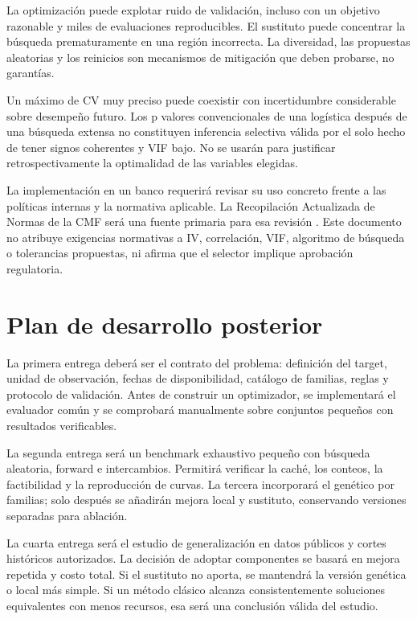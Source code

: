 \documentclass[11pt,letterpaper]{article}
\begin{document}
La optimización puede explotar ruido de validación, incluso con un objetivo razonable y miles de evaluaciones reproducibles. El sustituto puede concentrar la búsqueda prematuramente en una región incorrecta. La diversidad, las propuestas aleatorias y los reinicios son mecanismos de mitigación que deben probarse, no garantías.

Un máximo de CV muy preciso puede coexistir con incertidumbre considerable sobre desempeño futuro. Los p valores convencionales de una logística después de una búsqueda extensa no constituyen inferencia selectiva válida por el solo hecho de tener signos coherentes y VIF bajo. No se usarán para justificar retrospectivamente la optimalidad de las variables elegidas.

La implementación en un banco requerirá revisar su uso concreto frente a las políticas internas y la normativa aplicable. La Recopilación Actualizada de Normas de la CMF será una fuente primaria para esa revisión \cite{ref14}. Este documento no atribuye exigencias normativas a IV, correlación, VIF, algoritmo de búsqueda o tolerancias propuestas, ni afirma que el selector implique aprobación regulatoria.

\section{Plan de desarrollo posterior}\label{sec:14}

La primera entrega deberá ser el contrato del problema: definición del target, unidad de observación, fechas de disponibilidad, catálogo de familias, reglas y protocolo de validación. Antes de construir un optimizador, se implementará el evaluador común y se comprobará manualmente sobre conjuntos pequeños con resultados verificables.

La segunda entrega será un benchmark exhaustivo pequeño con búsqueda aleatoria, forward e intercambios. Permitirá verificar la caché, los conteos, la factibilidad y la reproducción de curvas. La tercera incorporará el genético por familias; solo después se añadirán mejora local y sustituto, conservando versiones separadas para ablación.

La cuarta entrega será el estudio de generalización en datos públicos y cortes históricos autorizados. La decisión de adoptar componentes se basará en mejora repetida y costo total. Si el sustituto no aporta, se mantendrá la versión genética o local más simple. Si un método clásico alcanza consistentemente soluciones equivalentes con menos recursos, esa será una conclusión válida del estudio.
\end{document}
